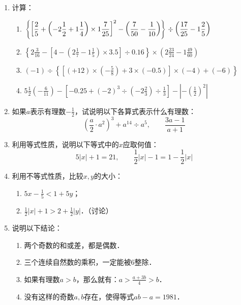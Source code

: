 \begin{enumerate}
	\item 计算：
	\begin{enumerate}
		\item $\left\{\left[\dfrac{2}{5}+\left(-2\dfrac{1}{2}+1\dfrac{1}{4}\right)\times 1\dfrac{7}{25}\right]^2-\left(\dfrac{7}{50}-\dfrac{1}{10}\right)     \right\}\div\left(\dfrac{17}{25}-1 \dfrac{2}{5}\right) $
		\item $\left\{2 \frac{3}{16}-\left[4-\left(2 \frac{1}{7}-1 \frac{1}{5}\right) \times 3.5\right] \div 0.16\right\} 
		\times\left(2 \frac{23}{24}-1 \frac{49}{60}\right) $
		\item $(-1)\div \left\{\left[(+12) \times\left(-\frac{5}{8}\right)+3 \times(-0.5) \right] \times(-4)+(-6)\right\} $
		\item $5 \frac{1}{2}\left(-\frac{6}{11}\right)-\left[-0.25+(-2)^{3}\div \left(-2 \frac{2}{3}\right) \div \frac{1}{3}\right]-\left|-\left(\frac{1}{2}\right)^{2}\right|$
	\end{enumerate}
	
	\item   如果$a$表示有理数$-\frac{1}{2}$，试说明以下各算式表示什么有理数：
	\[\left(\frac{a}{2}\cdot a^2\right)^3+a^{14}\div a^5,\qquad \frac{3a-1}{a+1}  \]
	
	\item   利用等式性质，说明以下等式中的$x$应取何值：
	\[5|x|+1=21,\qquad \frac{1}{2}|x|-1=1-\frac{1}{2}|x|  \]
	
	\item  利用不等式性质，比较$x,  y$的大小：
	\begin{enumerate}
		\item $5x-\frac{1}{5}<1+5y$；
		\item $\frac{1}{2}|x|+1>2+\frac{1}{2}|y|$．（讨论）
	\end{enumerate}
	
	\item 说明以下结论：
	\begin{enumerate}
		\item 两个奇数的和或差，都是偶数．
		\item 三个连续自然数的乘积，一定能被6整除．
		\item 如果有理数$a>b$，那么就有：$a>\frac{a+3b}{4}>b$．
		\item 没有这样的奇数$a,  b$存在，使得等式$ab-a=1981$．
	\end{enumerate}
	
	
\end{enumerate}
